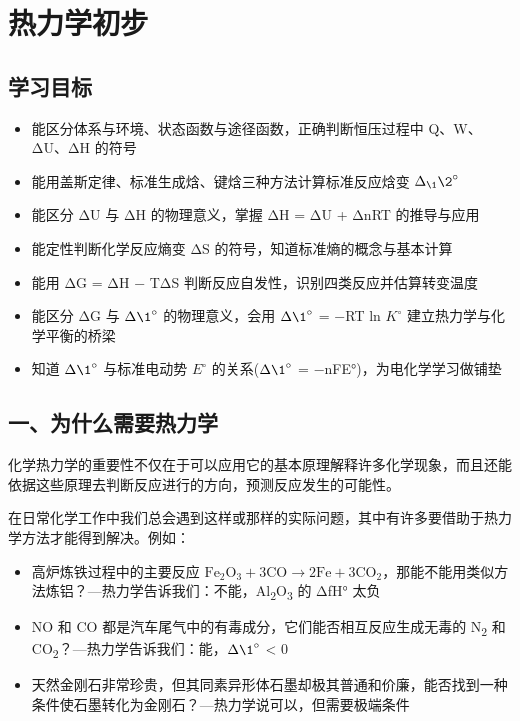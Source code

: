 \section{热力学初步}\label{ux70edux529bux5b66ux521dux6b65}

\subsection{学习目标}\label{ux5b66ux4e60ux76eeux6807}

\begin{itemize}
\tightlist
\item
  能区分体系与环境、状态函数与途径函数，正确判断恒压过程中 Q、W、ΔU、ΔH 的符号
\item
  能用盖斯定律、标准生成焓、键焓三种方法计算标准反应焓变 \(\Delta_{\1} \2^{\circ}\)
\item
  能区分 ΔU 与 ΔH 的物理意义，掌握 ΔH = ΔU + ΔnRT 的推导与应用
\item
  能定性判断化学反应熵变 ΔS 的符号，知道标准熵的概念与基本计算
\item
  能用 ΔG = ΔH − TΔS 判断反应自发性，识别四类反应并估算转变温度
\item
  能区分 ΔG 与 \(\Delta \1^{\circ}\) 的物理意义，会用 \(\Delta \1^{\circ}\) = −RT ln \(K^{\circ}\) 建立热力学与化学平衡的桥梁
\item
  知道 \(\Delta \1^{\circ}\) 与标准电动势 \(E^{\circ}\) 的关系(\(\Delta \1^{\circ}\) = −nFE°)，为电化学学习做铺垫
\end{itemize}

\subsection{一、为什么需要热力学}\label{ux4e00ux4e3aux4ec0ux4e48ux9700ux8981ux70edux529bux5b66}

化学热力学的重要性不仅在于可以应用它的基本原理解释许多化学现象，而且还能依据这些原理去判断反应进行的方向，预测反应发生的可能性。

在日常化学工作中我们总会遇到这样或那样的实际问题，其中有许多要借助于热力学方法才能得到解决。例如：

\begin{itemize}
\tightlist
\item
  高炉炼铁过程中的主要反应 \(\mathrm{Fe_2O_3 + 3CO \to 2Fe + 3CO_2}\)，那能不能用类似方法炼铝？---热力学告诉我们：不能，Al\textsubscript{2}O\textsubscript{3} 的 ΔfH° 太负
\item
  NO 和 CO 都是汽车尾气中的有毒成分，它们能否相互反应生成无毒的 N\textsubscript{2} 和 CO\textsubscript{2}？---热力学告诉我们：能，\(\Delta \1^{\circ}\) \textless{} 0
\item
  天然金刚石非常珍贵，但其同素异形体石墨却极其普通和价廉，能否找到一种条件使石墨转化为金刚石？---热力学说可以，但需要极端条件
\end{itemize}

